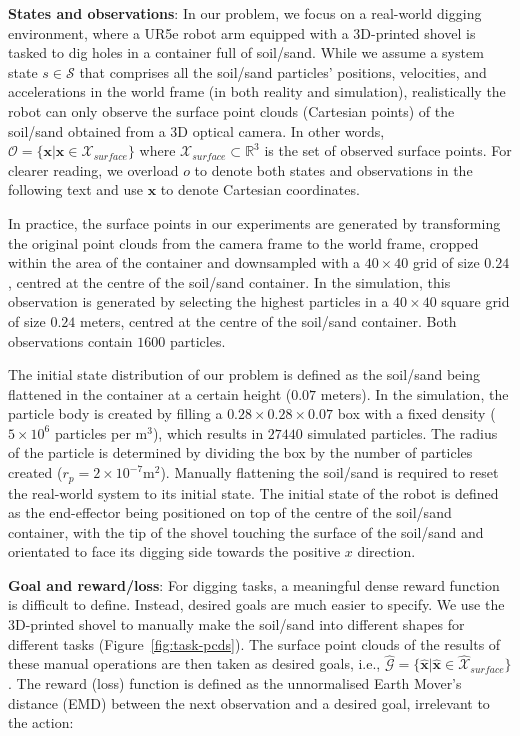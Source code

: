 \documentclass[letterpaper, 10 pt, journal, twoside]{ieeetran}
\begin{document}
\textbf{States and observations}: In our problem, we focus on a real-world digging environment, where a UR5e robot arm equipped with a 3D-printed shovel is tasked to dig holes in a container full of soil/sand. While we assume a system state $s\in\mathcal{S}$ that comprises all the soil/sand particles' positions, velocities, and accelerations in the world frame (in both reality and simulation), realistically the robot can only observe the surface point clouds (Cartesian points) of the soil/sand obtained from a 3D optical camera. In other words, $\mathcal{O}=\{\pmb{x}|\pmb{x}\in\mathcal{X}_{surface}\}$ where $\mathcal{X}_{surface}\subset\mathbb{R}^3$ is the set of observed surface points. For clearer reading, we overload $o$ to denote both states and observations in the following text and use $\pmb{x}$ to denote Cartesian coordinates.

In practice, the surface points in our experiments are generated by transforming the original point clouds from the camera frame to the world frame, cropped within the area of the container and downsampled with a $40\times40$ grid of size $0.24$, centred at the centre of the soil/sand container. In the simulation, this observation is generated by selecting the highest particles in a $40\times40$ square grid of size $0.24$ meters, centred at the centre of the soil/sand container. Both observations contain $1600$ particles.

The initial state distribution of our problem is defined as the soil/sand being flattened in the container at a certain height ($0.07$ meters). In the simulation, the particle body is created by filling a $0.28\times0.28\times0.07$ box with a fixed density ($5\times10^6$ particles per m$^3$), which results in $27440$ simulated particles. The radius of the particle is determined by dividing the box by the number of particles created ($r_p=2\times10^{-7}$m$^2$). Manually flattening the soil/sand is required to reset the real-world system to its initial state. The initial state of the robot is defined as the end-effector being positioned on top of the centre of the soil/sand container, with the tip of the shovel touching the surface of the soil/sand and orientated to face its digging side towards the positive $x$ direction.

\textbf{Goal and reward/loss}: For digging tasks, a meaningful dense reward function is difficult to define. Instead, desired goals are much easier to specify. We use the 3D-printed shovel to manually make the soil/sand into different shapes for different tasks (Figure~\ref{fig:task-pcds}). The surface point clouds of the results of these manual operations are then taken as desired goals, i.e., $\hat{\mathcal{G}}=\{\hat{\pmb{x}}|\hat{\pmb{x}}\in\hat{\mathcal{X}}_{surface}\}$. The reward (loss) function is defined as the unnormalised Earth Mover's distance (EMD) between the next observation and a desired goal, irrelevant to the action:
\end{document}
